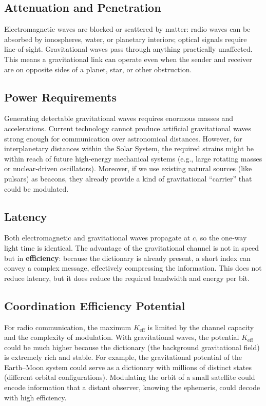 \documentclass[12pt,a4paper]{article}
\newcommand{\Keff}{K_{\mathrm{eff}}}
\begin{document}
	\subsection{Attenuation and Penetration}
	
	Electromagnetic waves are blocked or scattered by matter: radio waves can be absorbed by ionospheres, water, or planetary interiors; optical signals require line‑of‑sight. Gravitational waves pass through anything practically unaffected. This means a gravitational link can operate even when the sender and receiver are on opposite sides of a planet, star, or other obstruction.
	
	\subsection{Power Requirements}
	
	Generating detectable gravitational waves requires enormous masses and accelerations. Current technology cannot produce artificial gravitational waves strong enough for communication over astronomical distances. However, for interplanetary distances within the Solar System, the required strains might be within reach of future high‑energy mechanical systems (e.g., large rotating masses or nuclear‑driven oscillators). Moreover, if we use existing natural sources (like pulsars) as beacons, they already provide a kind of gravitational “carrier” that could be modulated.
	
	\subsection{Latency}
	
	Both electromagnetic and gravitational waves propagate at \(c\), so the one‑way light time is identical. The advantage of the gravitational channel is not in speed but in \textbf{efficiency}: because the dictionary is already present, a short index can convey a complex message, effectively compressing the information. This does not reduce latency, but it does reduce the required bandwidth and energy per bit.
	
	\subsection{Coordination Efficiency Potential}
	
	For radio communication, the maximum \(\Keff\) is limited by the channel capacity and the complexity of modulation. With gravitational waves, the potential \(\Keff\) could be much higher because the dictionary (the background gravitational field) is extremely rich and stable. For example, the gravitational potential of the Earth–Moon system could serve as a dictionary with millions of distinct states (different orbital configurations). Modulating the orbit of a small satellite could encode information that a distant observer, knowing the ephemeris, could decode with high efficiency.
	
\end{document}
